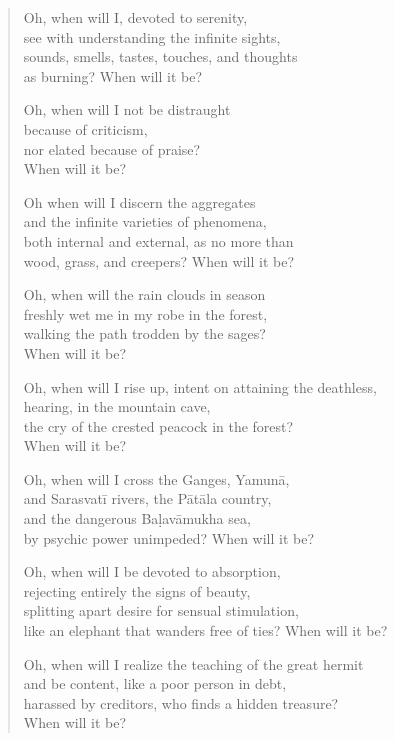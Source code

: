 \documentclass[12pt,openany]{book}%
\begin{document}
\begin{verse}
Oh, when will I, devoted to serenity, \\
see with understanding the infinite sights, \\
sounds, smells, tastes, touches, and thoughts \\
as burning? When will it be? 

Oh, when will I not be distraught \\
because of criticism, \\
nor elated because of praise? \\
When will it be? 

Oh when will I discern the aggregates \\
and the infinite varieties of phenomena, \\
both internal and external, as no more than \\
wood, grass, and creepers? When will it be? 

Oh, when will the rain clouds in season \\
freshly wet me in my robe in the forest, \\
walking the path trodden by the sages? \\
When will it be? 

Oh, when will I rise up, intent on attaining the deathless, \\
hearing, in the mountain cave, \\
the cry of the crested peacock in the forest? \\
When will it be? 

Oh, when will I cross the Ganges, \textsanskrit{Yamunā}, \\
and \textsanskrit{Sarasvatī} rivers, the \textsanskrit{Pātāla} country, \\
and the dangerous \textsanskrit{Baḷavāmukha} sea, \\
by psychic power unimpeded? When will it be? 

Oh, when will I be devoted to absorption, \\
rejecting entirely the signs of beauty, \\
splitting apart desire for sensual stimulation, \\
like an elephant that wanders free of ties? When will it be? 

Oh, when will I realize the teaching of the great hermit \\
and be content, like a poor person in debt, \\
harassed by creditors, who finds a hidden treasure? \\
When will it be? 


\end{verse}
\end{document}
